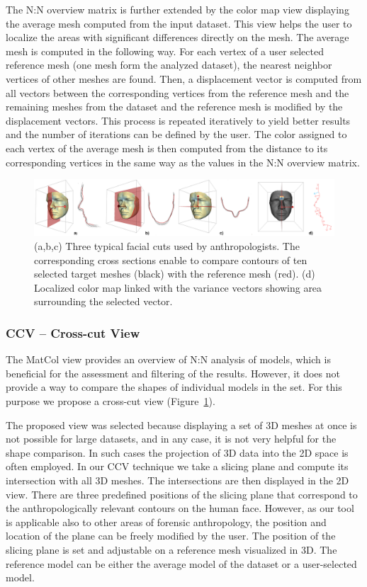 \documentclass[final,5p,times]{elsarticle}
\begin{document}
The N:N overview matrix is further extended by the color map view displaying the average mesh computed from the input dataset. 
This view helps the user to localize the areas with significant differences directly on the mesh.
The average mesh is computed in the following way.
For each vertex of a user selected reference mesh (one mesh form the analyzed dataset), the nearest neighbor vertices of other meshes are found.
Then, a displacement vector is computed from all vectors between the corresponding vertices from the reference mesh and the remaining meshes from the dataset and the reference mesh is modified by the displacement vectors.
This process is repeated iteratively to yield better results and the number of iterations can be defined by the user.
The color assigned to each vertex of the average mesh is then computed from the distance to its corresponding vertices in the same way as the values in the N:N overview matrix.

\begin{figure}[htb]
	\centering
  \includegraphics[width=0.9\linewidth]{pictures/cross.png}
  \caption{\label{fig:cross} (a,b,c) Three typical facial cuts used by anthropologists. The corresponding cross sections enable to compare contours of ten selected target meshes (black) with the reference mesh (red). (d) Localized color map linked with the variance vectors showing area surrounding the selected vector.}
	\vspace{-2mm}
\end{figure}

\subsubsection{CCV -- Cross-cut View}
The MatCol view provides an overview of N:N analysis of models, which is beneficial for the assessment and filtering of the results. 
However, it does not provide a way to compare the shapes of individual models in the set.
For this purpose we propose a cross-cut view (Figure~\ref{fig:cross}).

The proposed view was selected because displaying a set of 3D meshes at once is not possible for large datasets, and in any case, it is not very helpful for the shape comparison. 
In such cases the projection of 3D data into the 2D space is often employed.
In our CCV technique we take a slicing plane and compute its intersection with all 3D meshes.
The intersections are then displayed in the 2D view.
There are three predefined positions of the slicing plane that correspond to the anthropologically relevant contours on the human face. 
However, as our tool is applicable also to other areas of forensic anthropology, the position and location of the plane can be freely modified by the user.
The position of the slicing plane is set and adjustable on a reference mesh visualized in 3D.
The reference model can be either the average model of the dataset or a user-selected model.
\end{document}
